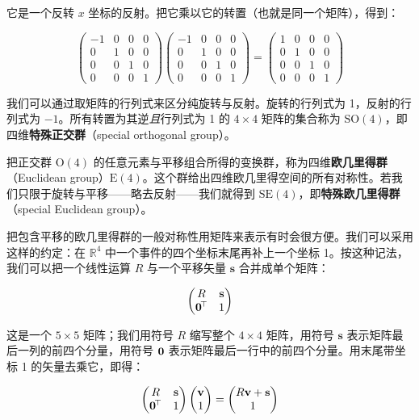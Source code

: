 它是一个反转 $x$ 坐标的反射。把它乘以它的转置（也就是同一个矩阵），得到：

\begin{equation}
\begin{pmatrix}
-1 & 0 & 0 & 0\\
0 & 1 & 0 & 0\\
0 & 0 & 1 & 0\\
0 & 0 & 0 & 1
\end{pmatrix}
\begin{pmatrix}
-1 & 0 & 0 & 0\\
0 & 1 & 0 & 0\\
0 & 0 & 1 & 0\\
0 & 0 & 0 & 1
\end{pmatrix}
=
\begin{pmatrix}
1 & 0 & 0 & 0\\
0 & 1 & 0 & 0\\
0 & 0 & 1 & 0\\
0 & 0 & 0 & 1
\end{pmatrix}
\end{equation}

我们可以通过取矩阵的行列式来区分纯旋转与反射。旋转的行列式为 1，反射的行列式为 $-1$。所有转置为其逆\emph{且}行列式为 1 的 $4\times4$ 矩阵的集合称为 $\mathrm{SO}(4)$，即四维\textbf{特殊正交群}（special orthogonal group）。

把正交群 $\mathrm{O}(4)$ 的任意元素与平移组合所得的变换群，称为四维\textbf{欧几里得群}（Euclidean group）$\mathrm{E}(4)$。这个群给出四维欧几里得空间的所有对称性。若我们只限于旋转与平移——略去反射——我们就得到 $\mathrm{SE}(4)$，即\textbf{特殊欧几里得群}（special Euclidean group）。

把包含平移的欧几里得群的一般对称性用矩阵来表示有时会很方便。我们可以采用这样的约定：在 $\mathbb{R}^{4}$ 中一个事件的四个坐标末尾再补上一个坐标 1。按这种记法，我们可以把一个线性运算 $R$ 与一个平移矢量 $\mathbf{s}$ 合并成单个矩阵：

\begin{equation}
\begin{pmatrix}
R & \mathbf{s}\\
\mathbf{0}^{\!\top} & 1
\end{pmatrix}
\end{equation}

这是一个 $5\times5$ 矩阵；我们用符号 $R$ 缩写整个 $4\times4$ 矩阵，用符号 $\mathbf{s}$ 表示矩阵最后一列的前四个分量，用符号 $\mathbf{0}$ 表示矩阵最后一行中的前四个分量。用末尾带坐标 1 的矢量去乘它，即得：

\begin{equation}
\begin{pmatrix}
R & \mathbf{s}\\
\mathbf{0}^{\!\top} & 1
\end{pmatrix}
\begin{pmatrix}
\mathbf{v}\\
1
\end{pmatrix}
=
\begin{pmatrix}
R\mathbf{v} + \mathbf{s}\\
1
\end{pmatrix}
\end{equation}

